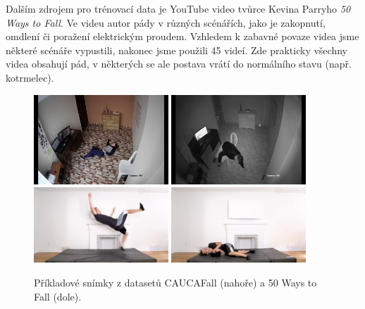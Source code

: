 Dalším zdrojem pro trénovací data je YouTube video tvůrce Kevina Parryho
\textit{50 Ways to Fall}. Ve videu autor pády v různých scénářích, jako je
zakopnutí, omdlení či poražení elektrickým proudem. Vzhledem k zabavné povaze
videa jsme některé scénáře vypustili, nakonec jsme použili 45 videí. Zde prakticky všechny videa obsahují pád, v některých se ale postava vrátí do normálního stavu (např. kotrmelec).

\begin{figure}[]
    \centering
    \includegraphics[width=0.45\textwidth]{Figures/datasets_examples/cauca1.png}
    \includegraphics[width=0.45\textwidth]{Figures/datasets_examples/cauca2.png}
    \includegraphics[width=0.45\textwidth]{Figures/datasets_examples/fifty1.png}
    \includegraphics[width=0.45\textwidth]{Figures/datasets_examples/fifty2.png}
    \caption{Příkladové snímky z datasetů CAUCAFall (nahoře) a 50 Ways to Fall (dole).}
    \label{fig:datasets_examples}
\end{figure}

